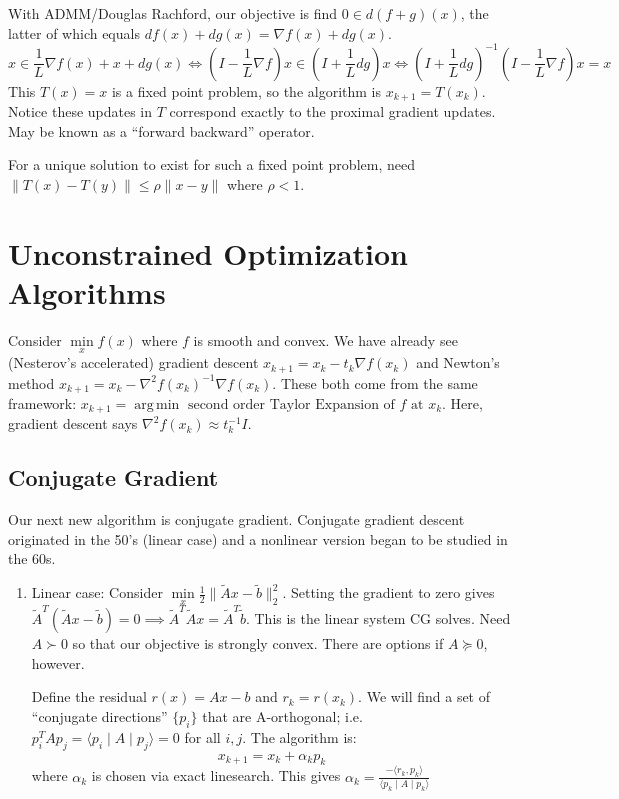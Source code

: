 \documentclass[english, 11pt]{article}
\DeclareMathOperator*{\argmin}{arg\,min}
\begin{document}
\begin{rem}
With ADMM/Douglas Rachford, our objective is find $0 \in d(f+g)(x)$, the latter of which equals $df(x) + dg(x) = \nabla f(x) + dg(x)$.
\[
x \in \frac{1}{L} \nabla f(x) + x + dg(x) \iff \left(I - \frac{1}{L} \nabla f \right) x \in \left(I + \frac{1}{L} dg \right) x \iff \left(I + \frac{1}{L} dg \right) ^{-1} \left(I - \frac{1}{L} \nabla f \right) x =x
\]
This $T(x) =x$ is a fixed point problem, so the algorithm is $x_{k+1} = T(x_k)$. Notice these updates in $T$ correspond exactly to the proximal gradient updates. May be known as a ``forward backward'' operator.

For a unique solution to exist for such a fixed point problem, need $\|T(x)-T(y)\| \le \rho \|x-y\|$ where $\rho<1$. 
\end{rem}


\section{Unconstrained Optimization Algorithms}
Consider $\min \limits_x f(x)$ where $f$ is smooth and convex. We have already see (Nesterov's accelerated) gradient descent $x_{k+1} = x_k - t_k \nabla f(x_k)$ and Newton's method $x_{k+1} = x_k - \nabla^2 f(x_k)^{-1} \nabla f(x_k)$.
These both come from the same framework: $x_{k+1} = \argmin \text{ second order Taylor Expansion of } f \text{ at } x_k$. Here, gradient descent says $\nabla^2 f(x_k) \approx t_k^{-1} I$.


\subsection{Conjugate Gradient}

Our next new algorithm is conjugate gradient. Conjugate gradient descent originated in the 50's (linear case) and a nonlinear version began to be studied in the 60s. 

\begin{enumerate}

\item Linear case: Consider $\min \limits_x \frac{1}{2} \| \tilde A x - \tilde b\|_2^2$. Setting the gradient to zero gives $\tilde A^T (\tilde A x - \tilde b)=0 \implies \tilde A^T \tilde A  x = \tilde A^T \tilde b$. This is the linear system CG solves. Need $A \succ 0$ so that our objective is strongly convex. There are options if $A \succeq 0$, however.

Define the residual $r(x) = Ax-b$ and $r_k = r(x_k)$. We will find a set of ``conjugate directions'' $\{p_i\}$ that are A-orthogonal; i.e. $p_i^T A p_j =\langle p_i \mid A \mid p_j \rangle = 0$ for all $i,j$. The algorithm is:
\[
x_{k+1} = x_k + \alpha_k p_k
\]
where $\alpha_k$ is chosen via exact linesearch. This gives $\alpha_k = \frac{ - \langle r_k , p_k \rangle}{\langle p_k \mid A \mid p_k \rangle}$

\end{enumerate}
\end{document}
